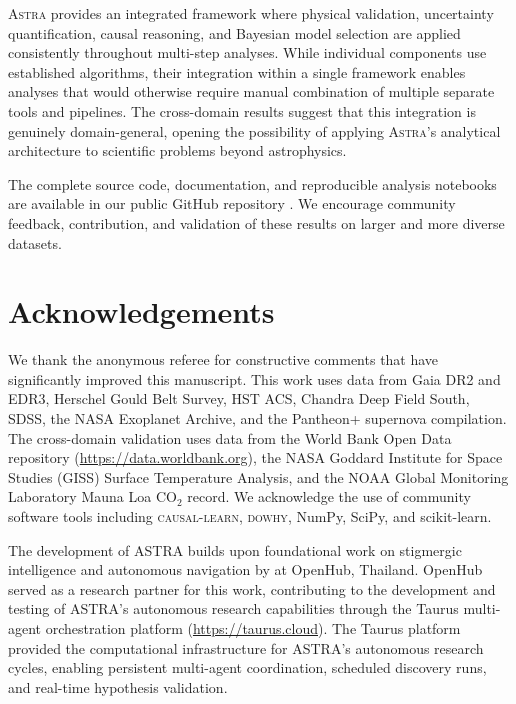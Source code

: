 \documentclass[usenatbib]{rasti}
\newcommand{\astra}{\textsc{Astra}\xspace}
\begin{document}
\astra provides an integrated framework where physical validation, uncertainty quantification, causal reasoning, and Bayesian model selection are applied consistently throughout multi-step analyses.
While individual components use established algorithms, their integration within a single framework enables analyses that would otherwise require manual combination of multiple separate tools and pipelines.
The cross-domain results suggest that this integration is genuinely domain-general, opening the possibility of applying \astra's analytical architecture to scientific problems beyond astrophysics.

The complete source code, documentation, and reproducible analysis notebooks are available in our public GitHub repository \citep{White2026}.
We encourage community feedback, contribution, and validation of these results on larger and more diverse datasets.

\section*{Acknowledgements}

We thank the anonymous referee for constructive comments that have significantly improved this manuscript.
This work uses data from Gaia DR2 and EDR3, Herschel Gould Belt Survey, HST ACS, Chandra Deep Field South, SDSS, the NASA Exoplanet Archive, and the Pantheon+ supernova compilation.
The cross-domain validation uses data from the World Bank Open Data repository (\url{https://data.worldbank.org}), the NASA Goddard Institute for Space Studies (GISS) Surface Temperature Analysis, and the NOAA Global Monitoring Laboratory Mauna Loa CO$_{2}$ record.
We acknowledge the use of community software tools including \textsc{causal-learn}, \textsc{dowhy}, NumPy, SciPy, and scikit-learn.

The development of ASTRA builds upon foundational work on stigmergic intelligence and autonomous navigation by \citet{Dey2025} at OpenHub, Thailand.
OpenHub served as a research partner for this work, contributing to the development and testing of ASTRA's autonomous research capabilities through the Taurus multi-agent orchestration platform (\url{https://taurus.cloud}).
The Taurus platform provided the computational infrastructure for ASTRA's autonomous research cycles, enabling persistent multi-agent coordination, scheduled discovery runs, and real-time hypothesis validation.
\end{document}
